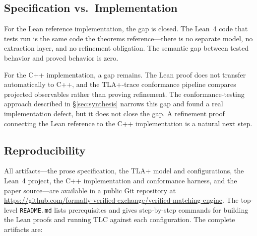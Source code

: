 \documentclass[11pt,a4paper]{article}
\begin{document}
\subsection{Specification vs.\ Implementation}

For the Lean reference implementation, the gap is closed. The Lean~4
code that tests run is the same code the theorems reference---there is
no separate model, no extraction layer, and no refinement obligation.
The semantic gap between tested behavior and proved behavior is zero.

For the C++ implementation, a gap remains. The Lean proof does not
transfer automatically to C++, and the TLA+-trace conformance pipeline
compares projected observables rather than proving refinement. The
conformance-testing approach described in \S\ref{sec:synthesis} narrows
this gap and found a real implementation defect, but it does not close
the gap. A refinement proof connecting the Lean reference to the C++
implementation is a natural next step.

\subsection{Reproducibility}

All artifacts---the prose specification, the TLA+ model and
configurations, the Lean~4 project, the C++ implementation and
conformance harness, and the paper source---are available
in a public Git repository at
\url{https://github.com/formally-verified-exchange/verified-matching-engine}.
The top-level \texttt{README.md} lists prerequisites and gives
step-by-step commands for building the Lean proofs and running TLC
against each configuration. The complete artifacts are:
\end{document}
